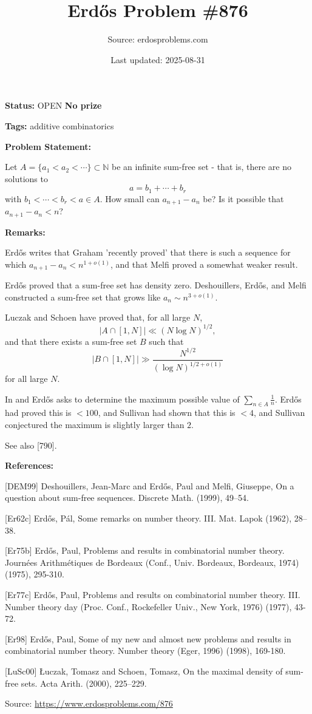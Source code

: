 \documentclass{article}
\title{Erd\H{o}s Problem \#876}
\date{Last updated: 2025-08-31}
\author{Source: erdosproblems.com}
\begin{document}
\maketitle

\noindent\textbf{Status:} OPEN \quad \textbf{No prize}

\noindent\textbf{Tags:} additive combinatorics

\medskip
\noindent\textbf{Problem Statement:}

Let $A=\{a_1<a_2<\cdots\}\subset \mathbb{N}$ be an infinite sum-free set - that is, there are no solutions to\[a=b_1+\cdots+b_r\]with $b_1<\cdots<b_r<a\in A$. How small can $a_{n+1}-a_n$ be? Is it possible that $a_{n+1}-a_n<n$?

\bigskip
\noindent\textbf{Remarks:}

Erd\H{o}s \cite{Er98} writes that Graham 'recently proved' that there is such a sequence for which $a_{n+1}-a_n<n^{1+o(1)}$, and that Melfi proved a somewhat weaker result.

Erd\H{o}s \cite{Er62c} proved that a sum-free set has density zero. Deshouillers, Erd\H{o}s, and Melfi \cite{DEM99} constructed a sum-free set that grows like $a_n\sim n^{3+o(1)}$.

Luczak and Schoen \cite{LuSc00} have proved that, for all large $N$,\[\lvert A\cap [1,N]\rvert\ll (N\log N)^{1/2},\]and that there exists a sum-free set $B$ such that\[\lvert B\cap [1,N]\rvert \gg \frac{N^{1/2}}{(\log N)^{1/2+o(1)}}\]for all large $N$.

In \cite{Er75b} and \cite{Er77c} Erd\H{o}s asks to determine the maximum possible value of $\sum_{n\in A}\frac{1}{n}$. Erd\H{o}s had proved this is $<100$, and Sullivan had shown that this is $<4$, and Sullivan conjectured the maximum is slightly larger than $2$.

See also [790].

\bigskip
\noindent\textbf{References:}

[DEM99] Deshouillers, Jean-Marc and Erd\H{o}s, Paul and Melfi,
Giuseppe, On a question about sum-free sequences. Discrete Math. (1999), 49--54.
 
 [Er62c] Erd\H{o}s, P\'{a}l, Some remarks on number theory. {III}. Mat. Lapok (1962), 28--38.
 
 [Er75b] Erd\H{o}s, Paul, Problems and results in combinatorial number theory. Journ\'{e}es Arithm\'{e}tiques de Bordeaux (Conf., Univ. Bordeaux, Bordeaux, 1974) (1975), 295-310.
 
 [Er77c] Erd\H{o}s, Paul, Problems and results on combinatorial number theory. III. Number theory day (Proc. Conf., Rockefeller Univ.,
New York, 1976) (1977), 43-72.
 
 [Er98] Erd\H{o}s, Paul, Some of my new and almost new problems and results in combinatorial number theory. Number theory (Eger, 1996) (1998), 169-180.
 
 [LuSc00] \L uczak, Tomasz and Schoen, Tomasz, On the maximal density of sum-free sets. Acta Arith. (2000), 225--229.

\bigskip
\noindent\small{Source: \url{https://www.erdosproblems.com/876}}
\end{document}
